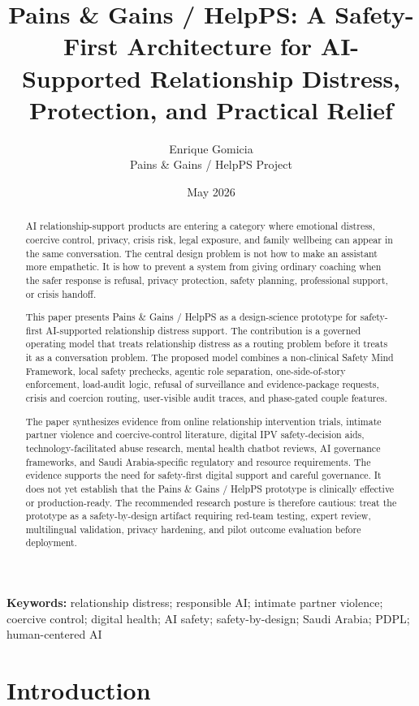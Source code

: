 \documentclass[11pt]{article}
\title{\textbf{Pains \& Gains / HelpPS: A Safety-First Architecture for AI-Supported Relationship Distress, Protection, and Practical Relief}}
\author{Enrique Gomicia\\Pains \& Gains / HelpPS Project}
\date{May 2026}
\begin{document}
\maketitle

\begin{abstract}
AI relationship-support products are entering a category where emotional distress, coercive control, privacy, crisis risk, legal exposure, and family wellbeing can appear in the same conversation. The central design problem is not how to make an assistant more empathetic. It is how to prevent a system from giving ordinary coaching when the safer response is refusal, privacy protection, safety planning, professional support, or crisis handoff.

This paper presents Pains \& Gains / HelpPS as a design-science prototype for safety-first AI-supported relationship distress support. The contribution is a governed operating model that treats relationship distress as a routing problem before it treats it as a conversation problem. The proposed model combines a non-clinical Safety Mind Framework, local safety prechecks, agentic role separation, one-side-of-story enforcement, load-audit logic, refusal of surveillance and evidence-package requests, crisis and coercion routing, user-visible audit traces, and phase-gated couple features.

The paper synthesizes evidence from online relationship intervention trials, intimate partner violence and coercive-control literature, digital IPV safety-decision aids, technology-facilitated abuse research, mental health chatbot reviews, AI governance frameworks, and Saudi Arabia-specific regulatory and resource requirements. The evidence supports the need for safety-first digital support and careful governance. It does not yet establish that the Pains \& Gains / HelpPS prototype is clinically effective or production-ready. The recommended research posture is therefore cautious: treat the prototype as a safety-by-design artifact requiring red-team testing, expert review, multilingual validation, privacy hardening, and pilot outcome evaluation before deployment.
\end{abstract}

\noindent\textbf{Keywords:} relationship distress; responsible AI; intimate partner violence; coercive control; digital health; AI safety; safety-by-design; Saudi Arabia; PDPL; human-centered AI

\section{Introduction}
\end{document}
